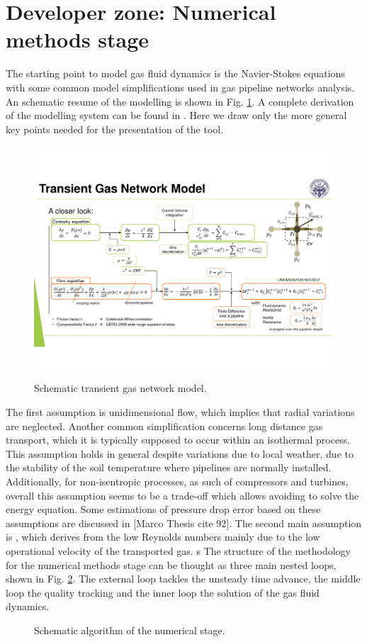 \section{Developer zone: Numerical methods stage}
\label{sec: numerical_methods}
The starting point to model gas fluid dynamics is the Navier-Stokes equations with some common model simplifications used in gas pipeline networks analysis. An schematic resume of the modelling is shown in Fig. \ref{fig: scheme_model}. A complete derivation of the modelling system can be found in \cite{Cavana2020}. Here we draw only the more general key points needed for the presentation of the tool. 
\begin{figure}[H]
    \centering
    \includegraphics[scale = 0.5]{img_methods/model_scheme.pdf}
    \caption{Schematic transient gas network model.}
    \label{fig: scheme_model}
\end{figure}
The first assumption is unidimensional flow, which implies that radial variations are neglected. Another common simplification concerns long distance gas transport, which it is typically supposed to occur within an isothermal process. This assumption holds in general despite variations due to local weather, due to the stability of the soil temperature where pipelines are normally installed. Additionally, for non-isentropic processes, as such of compressors and turbines, overall this assumption seems to be a trade-off which allows avoiding to solve the energy equation. Some estimations of pressure drop error based on these assumptions are discussed in [Marco Thesis cite 92]. The second main assumption is  , which derives from the low Reynolds numbers mainly due to the low operational velocity of the transported gas. 
s
The structure of the methodology for the numerical methods stage can be thought as three main nested loops, shown in Fig. \ref{fig: numerical_methods_stage}. The external loop tackles the unsteady time advance, the middle loop the quality tracking and the inner loop the solution of the gas fluid dynamics.  
\begin{figure}[H]
    \centering
    
    \caption{Schematic algorithm of the numerical stage.}
    \label{fig: numerical_methods_stage}
\end{figure}


